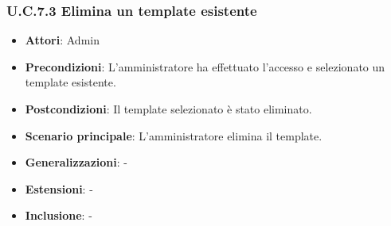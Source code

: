 \subsubsection{U.C.7.3 Elimina un template esistente}
\begin{itemize}
    \item \textbf{Attori}: Admin
    \item \textbf{Precondizioni}: L’amministratore ha effettuato l’accesso e selezionato un template esistente.
    \item \textbf{Postcondizioni}: Il template selezionato è stato eliminato.
    \item \textbf{Scenario principale}: L'amministratore elimina il template.
    \item \textbf{Generalizzazioni}: -
    \item \textbf{Estensioni}: -
    \item \textbf{Inclusione}: -
\end{itemize}
